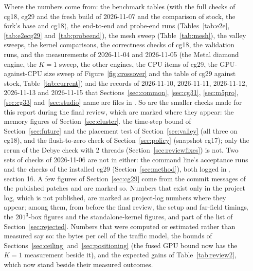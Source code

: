 Where the numbers come from: the benchmark tables (with the full checks of cg18, cg29 and the fresh build of
2026-11-07 and the comparison of stock, the fork's base and cg18), the end-to-end and probe-end runs
(Tables~\ref{tab:e2e}, \ref{tab:e2ecg29} and~\ref{tab:probeend}), the mesh sweep (Table~\ref{tab:mesh}), the valley
sweeps, the kernel comparisons, the correctness checks of cg18, the validation runs, and the measurements of
2026-11-04 and 2026-11-05 (the Metal diamond engine, the $K=1$ sweep, the other engines, the CPU items of cg29, the
GPU-against-CPU size sweep of Figure~\ref{fig:crossover} and the table of cg29 against stock, Table~\ref{tab:current})
and the records of 2026-11-10, 2026-11-11, 2026-11-12, 2026-11-13 and 2026-11-15 that Sections~\ref{sec:common}, \ref{sec:cg31},
\ref{sec:m5pro}, \ref{sec:cg33} and~\ref{sec:studio} name are files in . So are the smaller checks made for this report during the final review, which are marked
where they appear: the memory figures of Section~\ref{sec:cluster}, the time-step bound of Section~\ref{sec:future}
and the placement test of Section~\ref{sec:valley} (all three on cg18), and the flush-to-zero check of
Section~\ref{sec:policy} (snapshot cg17); only the rerun of the Debye check with 2 threads
(Section~\ref{sec:reviewfixes}) is not. Two sets of checks of 2026-11-06 are not in  either: the
command line's acceptance runs and the checks of the installed cg29 (Section~\ref{sec:method}), both logged in
, section 16. A few figures of Section~\ref{sec:cg29} come from the commit messages of the
published patches and are marked so. Numbers that exist only in the project log, which is not published, are marked as
project-log numbers where they appear; among them, from before the final review, the setup and far-field timings, the
$201^3$-box figures and the standalone-kernel figures, and part of the list of Section~\ref{sec:rejected}. Numbers
that were computed or estimated rather than measured say so: the bytes per cell of the traffic model, the bounds of
Sections~\ref{sec:ceiling} and~\ref{sec:positioning} (the fused GPU bound now has the $K=1$ measurement beside it),
and the expected gains of Table~\ref{tab:review2}, which now stand beside their measured outcomes.
